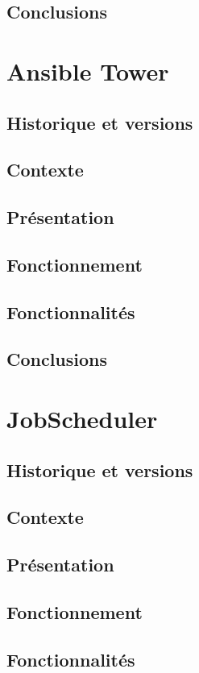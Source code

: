 \documentclass[12pt]{article}
\begin{document}
\subsection{Conclusions}

\section{Ansible Tower}
\subsection{Historique et versions}
\subsection{Contexte}
\subsection{Présentation}
\subsection{Fonctionnement}
\subsection{Fonctionnalités}
\subsection{Conclusions}

\section{JobScheduler}

\subsection{Historique et versions}
\subsection{Contexte}
\subsection{Présentation}
\subsection{Fonctionnement}
\subsection{Fonctionnalités}
\end{document}
